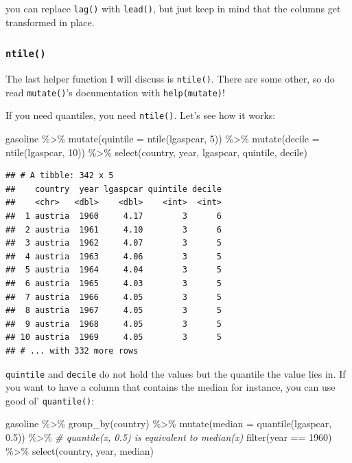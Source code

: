 \documentclass[
]{article}
\newenvironment{Shaded}{\begin{snugshade}}{\end{snugshade}}
\newcommand{\AttributeTok}[1]{\textcolor[rgb]{0.77,0.63,0.00}{#1}}
\newcommand{\CommentTok}[1]{\textcolor[rgb]{0.56,0.35,0.01}{\textit{#1}}}
\newcommand{\DecValTok}[1]{\textcolor[rgb]{0.00,0.00,0.81}{#1}}
\newcommand{\FloatTok}[1]{\textcolor[rgb]{0.00,0.00,0.81}{#1}}
\newcommand{\FunctionTok}[1]{\textcolor[rgb]{0.00,0.00,0.00}{#1}}
\newcommand{\NormalTok}[1]{#1}
\newcommand{\SpecialCharTok}[1]{\textcolor[rgb]{0.00,0.00,0.00}{#1}}
\begin{document}
you can replace \texttt{lag()} with \texttt{lead()}, but just keep in mind that the columns get transformed in
place.

\hypertarget{ntile}{%
\subsubsection{\texorpdfstring{\texttt{ntile()}}{ntile()}}\label{ntile}}

The last helper function I will discuss is \texttt{ntile()}. There are some other, so do read \texttt{mutate()}'s
documentation with \texttt{help(mutate)}!

If you need quantiles, you need \texttt{ntile()}. Let's see how it works:

\begin{Shaded}
\begin{Highlighting}[]
\NormalTok{gasoline }\SpecialCharTok{\%\textgreater{}\%}
  \FunctionTok{mutate}\NormalTok{(}\AttributeTok{quintile =} \FunctionTok{ntile}\NormalTok{(lgaspcar, }\DecValTok{5}\NormalTok{)) }\SpecialCharTok{\%\textgreater{}\%}
  \FunctionTok{mutate}\NormalTok{(}\AttributeTok{decile =} \FunctionTok{ntile}\NormalTok{(lgaspcar, }\DecValTok{10}\NormalTok{)) }\SpecialCharTok{\%\textgreater{}\%}
  \FunctionTok{select}\NormalTok{(country, year, lgaspcar, quintile, decile)}
\end{Highlighting}
\end{Shaded}

\begin{verbatim}
## # A tibble: 342 x 5
##    country  year lgaspcar quintile decile
##    <chr>   <dbl>    <dbl>    <int>  <int>
##  1 austria  1960     4.17        3      6
##  2 austria  1961     4.10        3      6
##  3 austria  1962     4.07        3      5
##  4 austria  1963     4.06        3      5
##  5 austria  1964     4.04        3      5
##  6 austria  1965     4.03        3      5
##  7 austria  1966     4.05        3      5
##  8 austria  1967     4.05        3      5
##  9 austria  1968     4.05        3      5
## 10 austria  1969     4.05        3      5
## # ... with 332 more rows
\end{verbatim}

\texttt{quintile} and \texttt{decile} do not hold the values but the quantile the value lies in. If you want to
have a column that contains the median for instance, you can use good ol' \texttt{quantile()}:

\begin{Shaded}
\begin{Highlighting}[]
\NormalTok{gasoline }\SpecialCharTok{\%\textgreater{}\%}
  \FunctionTok{group\_by}\NormalTok{(country) }\SpecialCharTok{\%\textgreater{}\%}
  \FunctionTok{mutate}\NormalTok{(}\AttributeTok{median =} \FunctionTok{quantile}\NormalTok{(lgaspcar, }\FloatTok{0.5}\NormalTok{)) }\SpecialCharTok{\%\textgreater{}\%} \CommentTok{\# quantile(x, 0.5) is equivalent to median(x)}
  \FunctionTok{filter}\NormalTok{(year }\SpecialCharTok{==} \DecValTok{1960}\NormalTok{) }\SpecialCharTok{\%\textgreater{}\%}
  \FunctionTok{select}\NormalTok{(country, year, median)}
\end{Highlighting}
\end{Shaded}
\end{document}
